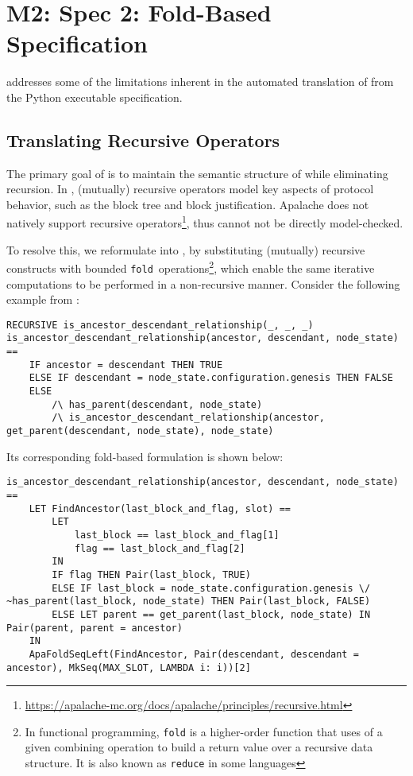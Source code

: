 
\section{M2: Spec 2: Fold-Based Specification}

\SpecTwo{} addresses some of the limitations inherent in the automated
translation of \SpecOne{} from the Python executable specification.

\subsection{Translating Recursive \tlap{} Operators}

The primary goal of \SpecTwo{} is to maintain the semantic structure of
\SpecOne{} while eliminating recursion. In \SpecOne{}, (mutually) recursive
operators model key aspects of protocol behavior, such as the block tree and
block justification. Apalache does not natively support recursive
operators\footnote{\url{https://apalache-mc.org/docs/apalache/principles/recursive.html}},
thus \SpecOne{} cannot not be directly model-checked.

To resolve this, we reformulate \SpecOne{} into \SpecTwo{}, by substituting
(mutually) recursive constructs with bounded
\texttt{fold}~operations\footnote{In functional programming, \texttt{fold} is a
  higher-order function that uses of a given combining operation to build a
  return value over a recursive data structure. It is also known as
\texttt{reduce} in some languages}, which enable the same iterative
computations to be performed in a non-recursive manner.
Consider the following example from \SpecOne{}:

\begin{lstlisting}[language=tla]
RECURSIVE is_ancestor_descendant_relationship(_, _, _)
is_ancestor_descendant_relationship(ancestor, descendant, node_state) ==
    IF ancestor = descendant THEN TRUE
    ELSE IF descendant = node_state.configuration.genesis THEN FALSE
    ELSE
        /\ has_parent(descendant, node_state)
        /\ is_ancestor_descendant_relationship(ancestor, get_parent(descendant, node_state), node_state)
\end{lstlisting}

Its corresponding fold-based formulation is shown below:

\begin{lstlisting}[language=tla]
is_ancestor_descendant_relationship(ancestor, descendant, node_state) ==
    LET FindAncestor(last_block_and_flag, slot) ==
        LET
            last_block == last_block_and_flag[1]
            flag == last_block_and_flag[2]
        IN
        IF flag THEN Pair(last_block, TRUE)
        ELSE IF last_block = node_state.configuration.genesis \/ ~has_parent(last_block, node_state) THEN Pair(last_block, FALSE)
        ELSE LET parent == get_parent(last_block, node_state) IN Pair(parent, parent = ancestor)
    IN
    ApaFoldSeqLeft(FindAncestor, Pair(descendant, descendant = ancestor), MkSeq(MAX_SLOT, LAMBDA i: i))[2]
\end{lstlisting}

